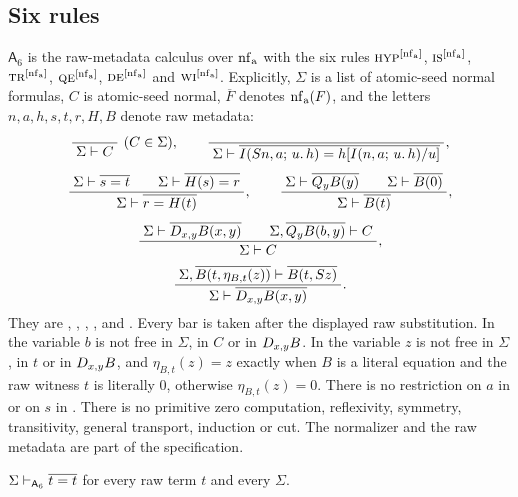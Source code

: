 \subsection{Six rules}

\begin{definition}
\label{comp:def:asix}
$\mathsf{A}_6$ is the raw-metadata calculus over $\operatorname{nf}_{\mathrm a}$ with the
six rules $\rulename{Hyp}^{[\nf_{\mathrm a}]}$,
$\rulename{IS}^{[\nf_{\mathrm a}]}$, $\rulename{Tr}^{[\nf_{\mathrm a}]}$,
$\rulename{QE}^{[\nf_{\mathrm a}]}$, $\rulename{DE}^{[\nf_{\mathrm a}]}$ and
$\rulename{WI}^{[\nf_{\mathrm a}]}$. Explicitly, $\Sigma$ is a list of
atomic-seed normal formulas, $C$ is atomic-seed normal, $\overline{F}$ denotes
$\operatorname{nf}_{\mathrm a}(F)$, and the letters $n,a,h,s,t,r,H,B$ denote raw metadata:
\begin{gather*}
 \dfrac{\;\;}{\;\Sigma\vdash C\;}\ (C\in\Sigma),
 \qquad
 \dfrac{\;\;}{\;\Sigma\vdash
  \overline{I(S n,a;\,u.\,h)=h[I(n,a;\,u.\,h)/u]}\;},
 \\[4pt]
 \dfrac{\;\Sigma\vdash\overline{s=t}\qquad\Sigma\vdash\overline{H(s)=r}\;}{\;\Sigma\vdash\overline{r=H(t)}\;},
 \qquad
 \dfrac{\;\Sigma\vdash\overline{Q_{y}B(y)}\qquad\Sigma\vdash\overline{B(0)}\;}{\;\Sigma\vdash\overline{B(t)}\;},
 \\[4pt]
 \dfrac{\;\Sigma\vdash\overline{D_{x,y}B(x,y)}\qquad
          \Sigma,\overline{Q_{y}B(b,y)}\vdash C\;}{\;\Sigma\vdash C\;},
 \\[4pt]
 \dfrac{\;\Sigma,\overline{B(t,\eta_{B,t}(z))}\vdash\overline{B(t,S z)}\;}{\;\Sigma\vdash\overline{D_{x,y}B(x,y)}\;}.
\end{gather*}
They are , , , ,
 and . Every bar is taken after the displayed raw
substitution. In  the variable $b$ is not free in $\Sigma$, in
$C$ or in $D_{x,y}B$. In  the variable $z$ is not free in
$\Sigma$, in $t$ or in $D_{x,y}B$, and $\eta_{B,t}(z)=z$ exactly when $B$ is
a literal equation and the raw witness $t$ is literally $0$, otherwise
$\eta_{B,t}(z)=0$. There is no restriction on $a$ in  or on $s$
in . There is no primitive zero computation, reflexivity,
symmetry, transitivity, general transport, induction or cut. The normalizer
and the raw metadata are part of the specification.
\end{definition}

\begin{lemma}
\label{comp:lem:asrefl}
$\Sigma\vdash_{\mathsf{A}_6}\overline{t=t}$ for every raw term $t$ and every
$\Sigma$.
\end{lemma}

